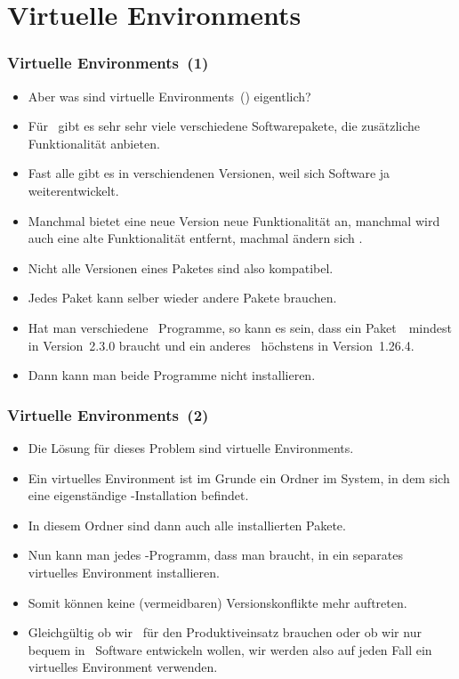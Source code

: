 \documentclass[aspectratio=169,mathserif,notheorems]{beamer}%
\begin{document}
\section{Virtuelle Environments}%
%
\begin{frame}%
\frametitle{Virtuelle Environments~(1)}%
\begin{itemize}%
\item Aber was sind virtuelle Environments~() eigentlich?%
\item<2-> Für \python\ gibt es sehr sehr viele verschiedene Softwarepakete, die zusätzliche Funktionalität anbieten.%
\item<3-> Fast alle gibt es in verschiendenen Versionen, weil sich Software ja weiterentwickelt.%
\item<4-> Manchmal bietet eine neue Version neue Funktionalität an, manchmal wird auch eine alte Funktionalität entfernt, machmal ändern sich .%
\item<5-> Nicht alle Versionen eines Paketes sind also kompatibel.%
\item<6-> Jedes Paket kann selber wieder andere Pakete brauchen.%
\item<7-> Hat man verschiedene \python\ Programme, so kann es sein, dass ein Paket~\numpy\ mindest in Version~2.3.0 braucht und ein anderes \numpy\ höchstens in Version~1.26.4.%
\item<8-> Dann kann man beide Programme nicht  installieren.%
\end{itemize}%
\end{frame}%
%
\begin{frame}%
\frametitle{Virtuelle Environments~(2)}%
\begin{itemize}%
\item Die Lösung für dieses Problem sind virtuelle Environments.
\item<2-> Ein virtuelles Environment ist im Grunde ein Ordner im System, in dem sich eine eigenständige \python-Installation befindet.%
\item<3-> In diesem Ordner sind dann auch alle installierten Pakete.%
\item<4-> Nun kann man jedes \python-Programm, dass man braucht, in ein separates virtuelles Environment installieren.%
\item<5-> Somit können keine (vermeidbaren) Versionskonflikte mehr auftreten.
\item<6-> Gleichgültig ob wir \psycopg\ für den Produktiveinsatz brauchen oder ob wir nur bequem in \pycharm\ Software entwickeln wollen, wir werden also auf jeden Fall ein virtuelles Environment verwenden.%
\end{itemize}%
\end{frame}%
%
\end{document}
